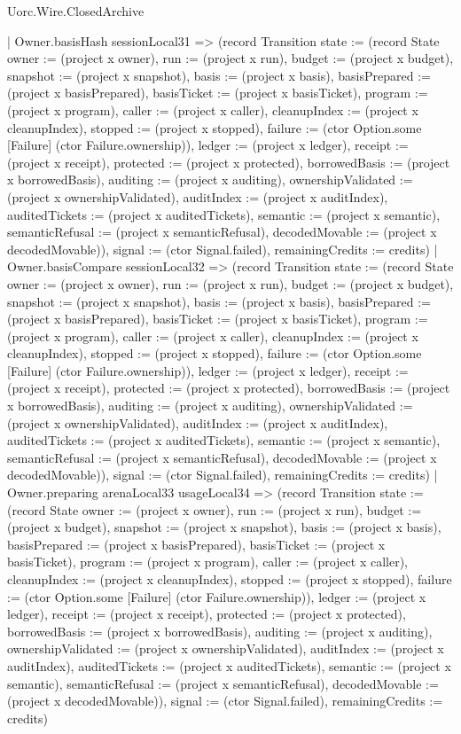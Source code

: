 \begin{lexlean}{Uorc.Wire.ClosedArchive}
\begin{semanticmodule}
{    | Owner.basisHash sessionLocal31 => (record Transition {state := (record State {owner := (project x owner), run := (project x run), budget := (project x budget), snapshot := (project x snapshot), basis := (project x basis), basisPrepared := (project x basisPrepared), basisTicket := (project x basisTicket), program := (project x program), caller := (project x caller), cleanupIndex := (project x cleanupIndex), stopped := (project x stopped), failure := (ctor Option.some [Failure] (ctor Failure.ownership)), ledger := (project x ledger), receipt := (project x receipt), protected := (project x protected), borrowedBasis := (project x borrowedBasis), auditing := (project x auditing), ownershipValidated := (project x ownershipValidated), auditIndex := (project x auditIndex), auditedTickets := (project x auditedTickets), semantic := (project x semantic), semanticRefusal := (project x semanticRefusal), decodedMovable := (project x decodedMovable)}), signal := (ctor Signal.failed), remainingCredits := credits})
    | Owner.basisCompare sessionLocal32 => (record Transition {state := (record State {owner := (project x owner), run := (project x run), budget := (project x budget), snapshot := (project x snapshot), basis := (project x basis), basisPrepared := (project x basisPrepared), basisTicket := (project x basisTicket), program := (project x program), caller := (project x caller), cleanupIndex := (project x cleanupIndex), stopped := (project x stopped), failure := (ctor Option.some [Failure] (ctor Failure.ownership)), ledger := (project x ledger), receipt := (project x receipt), protected := (project x protected), borrowedBasis := (project x borrowedBasis), auditing := (project x auditing), ownershipValidated := (project x ownershipValidated), auditIndex := (project x auditIndex), auditedTickets := (project x auditedTickets), semantic := (project x semantic), semanticRefusal := (project x semanticRefusal), decodedMovable := (project x decodedMovable)}), signal := (ctor Signal.failed), remainingCredits := credits})
    | Owner.preparing arenaLocal33 usageLocal34 => (record Transition {state := (record State {owner := (project x owner), run := (project x run), budget := (project x budget), snapshot := (project x snapshot), basis := (project x basis), basisPrepared := (project x basisPrepared), basisTicket := (project x basisTicket), program := (project x program), caller := (project x caller), cleanupIndex := (project x cleanupIndex), stopped := (project x stopped), failure := (ctor Option.some [Failure] (ctor Failure.ownership)), ledger := (project x ledger), receipt := (project x receipt), protected := (project x protected), borrowedBasis := (project x borrowedBasis), auditing := (project x auditing), ownershipValidated := (project x ownershipValidated), auditIndex := (project x auditIndex), auditedTickets := (project x auditedTickets), semantic := (project x semantic), semanticRefusal := (project x semanticRefusal), decodedMovable := (project x decodedMovable)}), signal := (ctor Signal.failed), remainingCredits := credits})
}
\end{semanticmodule}
\end{lexlean}
